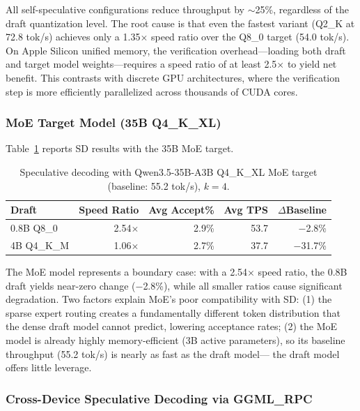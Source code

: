 \documentclass[11pt,a4paper]{article}
\begin{document}
All self-speculative configurations reduce throughput by $\sim$25\%, regardless
of the draft quantization level.
The root cause is that even the fastest variant (Q2\_K at 72.8 tok/s) achieves
only a 1.35$\times$ speed ratio over the Q8\_0 target (54.0 tok/s).
On Apple Silicon unified memory, the verification overhead---loading both draft
and target model weights---requires a speed ratio of at least 2.5$\times$ to
yield net benefit.
This contrasts with discrete GPU architectures, where the verification step is
more efficiently parallelized across thousands of CUDA cores.

\subsubsection{MoE Target Model (35B Q4\_K\_XL)}

Table~\ref{tab:sd_moe} reports SD results with the 35B MoE target.

\begin{table}[h]
\centering
\caption{Speculative decoding with Qwen3.5-35B-A3B Q4\_K\_XL MoE target (baseline: 55.2 tok/s), $k=4$.}
\label{tab:sd_moe}
\begin{tabular}{lrrrr}
\toprule
\textbf{Draft} & \textbf{Speed Ratio} & \textbf{Avg Accept\%} & \textbf{Avg TPS} & \textbf{$\Delta$Baseline} \\
\midrule
0.8B Q8\_0 & 2.54$\times$ & 2.9\% & 53.7 & $-$2.8\% \\
4B Q4\_K\_M & 1.06$\times$ & 2.7\% & 37.7 & $-$31.7\% \\
\bottomrule
\end{tabular}
\end{table}

The MoE model represents a boundary case: with a 2.54$\times$ speed ratio, the
0.8B draft yields near-zero change ($-$2.8\%), while all smaller ratios cause
significant degradation.
Two factors explain MoE's poor compatibility with SD:
(1) the sparse expert routing creates a fundamentally different token distribution
that the dense draft model cannot predict, lowering acceptance rates;
(2) the MoE model is already highly memory-efficient (3B active parameters),
so its baseline throughput (55.2 tok/s) is nearly as fast as the draft model---
the draft model offers little leverage.

\subsubsection{Cross-Device Speculative Decoding via GGML\_RPC}
\end{document}

